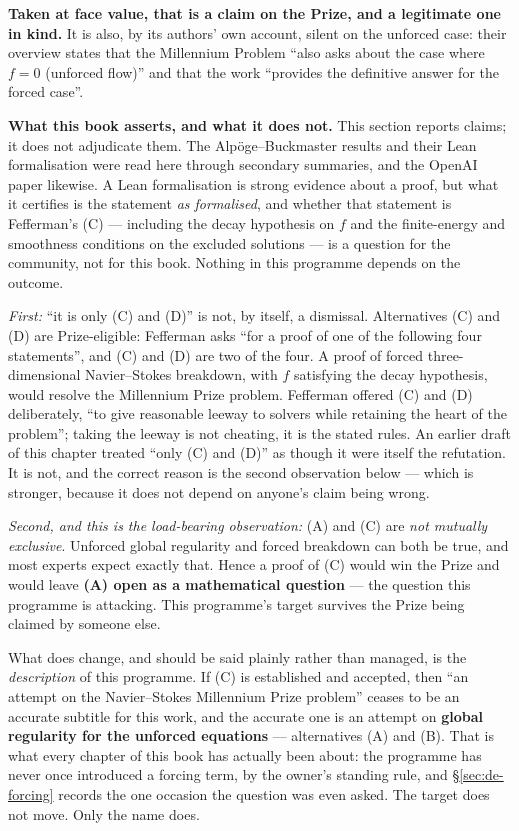 \textbf{Taken at face value, that is a claim on the Prize, and a legitimate
one in kind.} It is also, by its authors' own account, silent on the unforced
case: their overview states that the Millennium Problem ``also asks about the
case where \(f=0\) (unforced flow)'' and that the work ``provides the
definitive answer for the forced case''.

\begin{record}
\textbf{What this book asserts, and what it does not.} This section reports
claims; it does not adjudicate them. The Alp\"oge--Buckmaster results and
their Lean formalisation were read here through secondary summaries, and the
OpenAI paper likewise. A Lean formalisation is strong evidence about a proof,
but what it certifies is the statement \emph{as formalised}, and whether that
statement is Fefferman's (C) --- including the decay hypothesis on \(f\) and
the finite-energy and smoothness conditions on the excluded solutions --- is a
question for the community, not for this book. Nothing in this programme
depends on the outcome.
\end{record}

\begin{obsv}
\label{obs:s49-two-corrections}
\emph{First:} ``it is only (C) and (D)'' is not, by itself, a dismissal.
Alternatives (C) and (D) are Prize-eligible: Fefferman asks ``for a proof of
one of the following four statements'', and (C) and (D) are two of the four.
A proof of forced three-dimensional Navier--Stokes breakdown, with \(f\)
satisfying the decay hypothesis, would resolve the Millennium Prize problem.
Fefferman offered (C) and (D) deliberately, ``to give reasonable leeway to
solvers while retaining the heart of the problem''; taking the leeway is not
cheating, it is the stated rules. An earlier draft of this chapter treated
``only (C) and (D)'' as though it were itself the refutation. It is not, and
the correct reason is the second observation below --- which is stronger,
because it does not depend on anyone's claim being wrong.

\emph{Second, and this is the load-bearing observation:} (A) and (C) are
\emph{not mutually exclusive}. Unforced global regularity and forced
breakdown can both be true, and most experts expect exactly that. Hence a
proof of (C) would win the Prize and would leave \textbf{(A) open as a
mathematical question} --- the question this programme is attacking. This
programme's target survives the Prize being claimed by someone else.

What does change, and should be said plainly rather than managed, is the
\emph{description} of this programme. If (C) is established and accepted,
then ``an attempt on the Navier--Stokes Millennium Prize problem'' ceases to
be an accurate subtitle for this work, and the accurate one is an attempt on
\textbf{global regularity for the unforced equations} --- alternatives (A)
and (B). That is what every chapter of this book has actually been about:
the programme has never once introduced a forcing term, by the owner's
standing rule, and \S\ref{sec:de-forcing} records the one occasion the
question was even asked. The target does not move. Only the name does.
\end{obsv}

